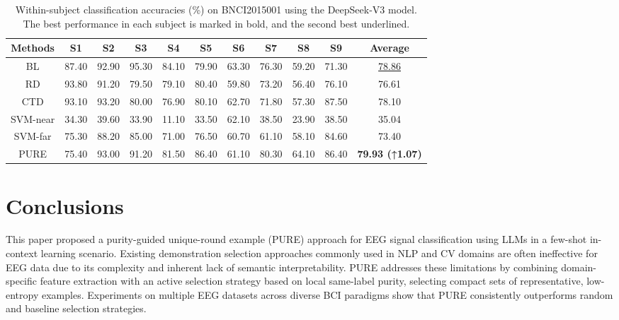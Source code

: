 \documentclass[journal,twocolumn]{IEEEtran}
\begin{document}
\begin{table}[htpb] \centering
  \caption{Within-subject classification accuracies (\%) on BNCI2015001 using the DeepSeek-V3 model. The best performance in each subject is marked in bold, and the second best underlined.}
  \label{tab:deepseek-result}
  \begin{tabular}{c|c|c|c|c|c|c|c|c|c|c}
  \toprule
  Methods & S1 & S2 & S3 & S4 & S5 & S6 & S7 & S8 & S9 & Average \\
  \midrule
  BL & 87.40 & 92.90 & 95.30 & 84.10 & 79.90 & 63.30 & 76.30 & 59.20 & 71.30 & \underline{78.86} \\
  RD & 93.80 & 91.20 & 79.50 & 79.10 & 80.40 & 59.80 & 73.20 & 56.40 & 76.10 & 76.61 \\
  CTD & 93.10 & 93.20 & 80.00 & 76.90 & 80.10 & 62.70 & 71.80 & 57.30 & 87.50 & 78.10 \\
  SVM-near & 34.30 & 39.60 & 33.90 & 11.10 & 33.50 & 62.10 & 38.50 & 23.90 & 38.50 & 35.04 \\
  SVM-far & 75.30 & 88.20 & 85.00 & 71.00 & 76.50 & 60.70 & 61.10 & 58.10 & 84.60 & 73.40 \\
  PURE & 75.40 & 93.00 & 91.20 & 81.50 & 86.40 & 61.10 & 80.30 & 64.10 & 86.40 & \textbf{79.93 (↑1.07)} \\
  \bottomrule
  \end{tabular}
\end{table}

\section{Conclusions}
\label{sec:conclusion}
This paper proposed a purity-guided unique-round example (PURE) approach for EEG signal classification using LLMs in a few-shot in-context learning scenario. Existing demonstration selection approaches commonly used in NLP and CV domains are often ineffective for EEG data due to its complexity and inherent lack of semantic interpretability. PURE addresses these limitations by combining domain-specific feature extraction with an active selection strategy based on local same-label purity, selecting compact sets of representative, low-entropy examples. Experiments on multiple EEG datasets across diverse BCI paradigms show that PURE consistently outperforms random and baseline selection strategies.


\end{document}
